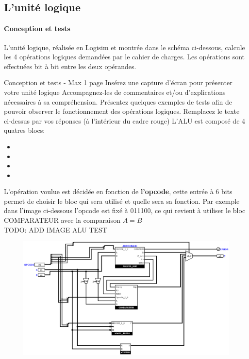 \documentclass[a4paper]{article}
\begin{document}
\subsection{L'unité logique}
\label{logique}

\paragraph{Conception et tests}
L’unité logique, réalisée en Logisim et montrée dans le schéma ci-dessous, calcule les 4 opérations logiques demandées par le cahier de charges. Les opérations sont effectuées bit à bit entre les deux opérandes.

\begin{tcolorbox}[colframe=Monokaimagenta,colback=white]
Conception et tests - Max 1 page 
Insérez une capture d’écran pour présenter votre unité logique
Accompagnez-les de commentaires et/ou d’explications nécessaires à sa compréhension.
Présentez quelques exemples de tests  afin de pouvoir observer le fonctionnement des opérations logiques.
Remplacez le texte ci-dessus par vos réponses (à l’intérieur du cadre rouge)
L'ALU est composé de 4 quatres blocs:
\begin{itemize}

\item    {}
\item    {}
\item    {}
\item    {}

\end{itemize}
L'opération voulue est décidée en fonction de \textbf{l'opcode}, cette entrée à 6 bits permet de choisir le bloc qui sera utilisé et quelle sera sa fonction. Par exemple dans l'image ci-dessous l'opcode est fixé à 011100, ce qui revient à utiliser le bloc COMPARATEUR avec la comparaison $A=B$\\

TODO: ADD IMAGE ALU TEST


\begin{figure}[H]
    \centering
    \includegraphics[width=\textwidth]{src/ALU.png}
    \label{fig:OVERFADDSUB_4BITS}
\end{figure}


\end{tcolorbox}
\end{document}
